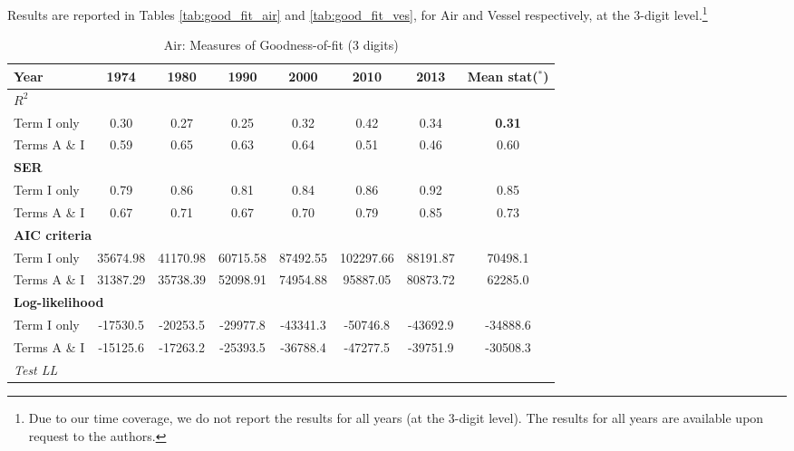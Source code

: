 \documentclass[a4paper,11pt]{article}
\begin{document}
Results are reported in Tables \ref{tab:good_fit_air} and \ref{tab:good_fit_ves}, for Air and Vessel respectively, at the 3-digit level.\footnote{Due to our time coverage, we do not report the results for all years (at the 3-digit level). The results for all years are available upon request to the authors.}\medskip

\begin{table}[htbp]
  \centering
  \caption{Air: Measures of Goodness-of-fit (3 digits)}
  \footnotesize{
\begin{center}
    \begin{tabular}{l|cccccc|c}
    \hline \hline
    Year  & 1974  & 1980  & 1990  & 2000  & \multicolumn{1}{c}{2010} & \multicolumn{1}{c}{2013} & Mean stat($^{\ast}$) \\ \hline
    \multicolumn{8}{l}{\bf{$R^2$} }\\ \hline
    Term I only & 0.30  & 0.27  & 0.25  & 0.32  & \multicolumn{1}{c}{0.42} & \multicolumn{1}{c}{0.34} & \textbf{0.31} \\
    Terms A \& I & 0.59  & 0.65  & 0.63  & 0.64  & \multicolumn{1}{c}{0.51} & \multicolumn{1}{c}{0.46} & 0.60 \\ \hline
    \multicolumn{8}{l}{\textbf{SER}  }  \\ \hline
    Term I only & 0.79  & 0.86  & 0.81  & 0.84  & \multicolumn{1}{c}{0.86} & \multicolumn{1}{c}{0.92} & 0.85 \\
    Terms A \& I & 0.67  & 0.71  & 0.67  & 0.70  & \multicolumn{1}{c}{0.79} & \multicolumn{1}{c}{0.85} & 0.73 \\ \hline
   \multicolumn{8}{l}{\textbf{AIC criteria}}  \\ \hline
    Term I only & 35674.98 & 41170.98 & 60715.58 & 87492.55 & \multicolumn{1}{c}{102297.66} & \multicolumn{1}{c}{88191.87} & 70498.1 \\
    Terms A \& I & 31387.29 & 35738.39 & 52098.91 & 74954.88 & \multicolumn{1}{c}{95887.05} & \multicolumn{1}{c}{80873.72} & 62285.0 \\ \hline
    \multicolumn{8}{l}{\textbf{Log-likelihood}} \\ \hline
    Term I only & -17530.5 & -20253.5 & -29977.8 & -43341.3 & \multicolumn{1}{c}{-50746.8} & \multicolumn{1}{c}{-43692.9} & -34888.6 \\
    Terms A \& I & -15125.6 & -17263.2 & -25393.5 & -36788.4 & \multicolumn{1}{c}{-47277.5} & \multicolumn{1}{c}{-39751.9} & -30508.3 \\
    \multicolumn{8}{l}{\textit{Test LL }}  \\

\end{tabular}
\end{center}}
\end{table}
\end{document}
